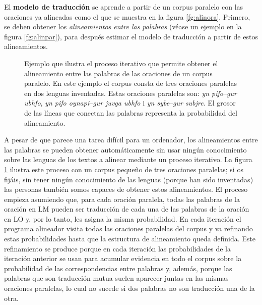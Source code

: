 El \textbf{modelo de traducción} se aprende a partir de un corpus paralelo con las oraciones ya alineadas como el que se muestra en la figura \ref{fg:alinora}. Primero, se deben obtener los \emph{alineamientos entre las palabras} (véase un ejemplo en la figura \ref{fg:alinpar}), para después estimar el modelo de traducción a partir de estos alineamientos. 

\begin{figure}[tb] \centering {} 

%


 \caption{Ejemplo que ilustra el proceso iterativo que permite obtener el alineamiento entre las palabras de las oraciones de un corpus paralelo. En este ejemplo el corpus consta de tres oraciones paralelas en dos lenguas inventadas. Estas oraciones paralelas son: \emph{yn pifo}--\emph{gur ubhfo}, \emph{yn pifo oynapi}--\emph{gur juvga ubhfo} i \emph{yn sybe}--\emph{gur subjre}. El grosor de las líneas que conectan las palabras representa la probabilidad del alineamiento.} \label{fg:pasosalin} \end{figure} 

A pesar de que parece una tarea difícil para un ordenador, los alineamientos entre las palabras se pueden obtener automáticamente sin usar ningún conocimiento sobre las lenguas de los textos a alinear mediante un proceso iterativo. La figura \ref{fg:pasosalin} ilustra este proceso con un corpus pequeño de tres oraciones paralelas; si os fijáis, sin tener ningún conocimiento de las lenguas (porque han sido inventadas) las personas también somos capaces de obtener estos alineamientos. El proceso empieza asumiendo que, para cada oración paralela, todas las palabras de la oración en LM pueden ser traducción de cada una de las palabras de la oración en LO y, por lo tanto, les asigna la misma probabilidad. En cada iteración el programa alineador visita todas las oraciones paralelas del corpus y va refinando estas probabilidades hasta que la estructura de alineamiento queda definida. Este refinamiento se produce porque en cada iteración las probabilidades de la iteración anterior se usan para acumular evidencia en todo el corpus sobre la probabilidad de las correspondencias entre palabras y, además, porque las palabras que son traducción mutua suelen aparecer juntas en las mismas oraciones paralelas, lo cual no sucede si dos palabras no son traducción una de la otra. 

